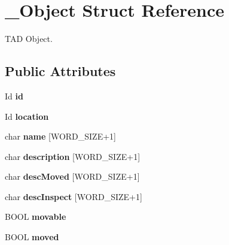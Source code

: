 \hypertarget{struct___object}{\section{\-\_\-\-Object Struct Reference}
\label{struct___object}
}


T\-A\-D Object.  


\subsection*{Public Attributes}
\begin{DoxyCompactItemize}
\item 
\hypertarget{struct___object_a3cff7a0e8dc4e9d23895ed9af1b7653a}{Id {\bfseries id}}\label{struct___object_a3cff7a0e8dc4e9d23895ed9af1b7653a}

\item 
\hypertarget{struct___object_a3c596b8898734de2f71fd1a33dfa72fb}{Id {\bfseries location}}\label{struct___object_a3c596b8898734de2f71fd1a33dfa72fb}

\item 
\hypertarget{struct___object_a03fb9b8d91f071e8e30d669be79cc040}{char {\bfseries name} \mbox{[}W\-O\-R\-D\-\_\-\-S\-I\-Z\-E+1\mbox{]}}\label{struct___object_a03fb9b8d91f071e8e30d669be79cc040}

\item 
\hypertarget{struct___object_add691deed525492ad692cc2f5bccfe90}{char {\bfseries description} \mbox{[}W\-O\-R\-D\-\_\-\-S\-I\-Z\-E+1\mbox{]}}\label{struct___object_add691deed525492ad692cc2f5bccfe90}

\item 
\hypertarget{struct___object_ae637e2b2c556d55cc7e1b452258afb9d}{char {\bfseries desc\-Moved} \mbox{[}W\-O\-R\-D\-\_\-\-S\-I\-Z\-E+1\mbox{]}}\label{struct___object_ae637e2b2c556d55cc7e1b452258afb9d}

\item 
\hypertarget{struct___object_af9a90ba94e000046703a3acbe3ab0ac9}{char {\bfseries desc\-Inspect} \mbox{[}W\-O\-R\-D\-\_\-\-S\-I\-Z\-E+1\mbox{]}}\label{struct___object_af9a90ba94e000046703a3acbe3ab0ac9}

\item 
\hypertarget{struct___object_ae013850f78da07c39e530f36bf98f2b9}{B\-O\-O\-L {\bfseries movable}}\label{struct___object_ae013850f78da07c39e530f36bf98f2b9}

\item 
\hypertarget{struct___object_a584096c8e43f53884aa7216505cc0e89}{B\-O\-O\-L {\bfseries moved}}\label{struct___object_a584096c8e43f53884aa7216505cc0e89}


\end{DoxyCompactItemize}
